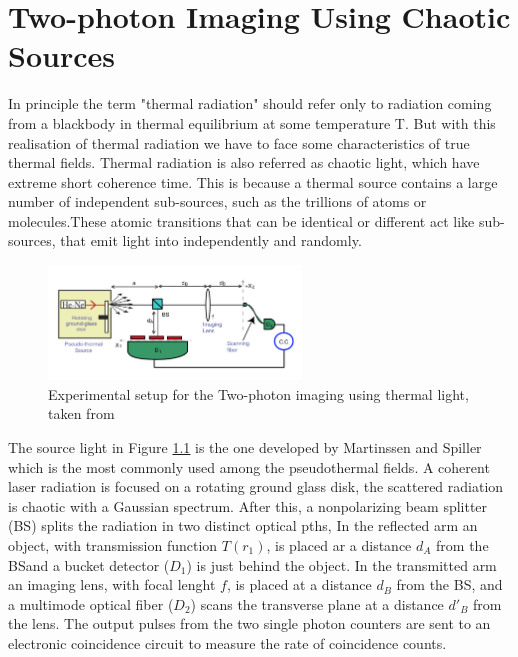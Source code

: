 
\chapter{Two-photon Imaging Using Chaotic Sources} %

\label{AppendixThermal} %


In principle the term "thermal radiation" should refer only to radiation coming 
from a blackbody in thermal equilibrium at some temperature T. But with this realisation of thermal radiation
we have to face some characteristics of true thermal fields. Thermal radiation is also referred as chaotic light, 
which have extreme short coherence time. This is because a thermal source contains a large number of independent sub-sources,
such as the trillions of atoms or molecules.These atomic transitions that can be identical or different
act like sub-sources, that emit light into independently and randomly. 



\begin{figure}[h!]
\centering
\includegraphics[width=0.6\textwidth]{Figures/thermalSetup.png}
\caption{Experimental setup for the Two-photon imaging using thermal light, taken from \cite{thermalAlejandra}} 
\label{fig:thermalSetup}
\end{figure}
The source light in Figure \ref{fig:thermalSetup} is the one developed by Martinssen and Spiller\cite{intensity}
which is the most commonly used among the pseudothermal fields. A  coherent laser radiation is focused on a rotating ground glass disk, 
the scattered radiation is chaotic with a Gaussian spectrum. After this, a nonpolarizing beam
splitter (BS) splits the radiation in two distinct optical pths, In the reflected arm an object, with 
transmission function $T(r_1)$, is placed ar a distance $d_A$ from the BSand a bucket detector ($D_1$)
is just behind the object. In the transmitted arm an imaging lens, with focal lenght $f$, is placed at a 
distance $d_B$ from the BS, and a multimode optical fiber ($D_2$) scans the transverse plane
at a distance $d'_B$ from the lens. The output pulses from the two single photon counters are sent 
to an electronic coincidence circuit to measure the rate of coincidence counts.

